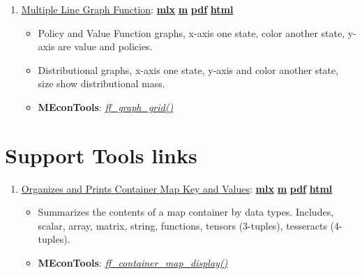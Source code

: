 \documentclass[
]{book}
\providecommand{\tightlist}{%
  \setlength{\itemsep}{0pt}\setlength{\parskip}{0pt}}
\begin{document}
\begin{enumerate}
\def\labelenumi{\arabic{enumi}.}
\tightlist
\item
  \href{https://fanwangecon.github.io/MEconTools/MEconTools/doc/graph/htmlpdfm/fx_graph_grid.html}{Multiple Line Graph Function}: \href{https://github.com/FanWangEcon/MEconTools/blob/master/MEconTools/doc/graph/fx_graph_grid.mlx}{\textbf{mlx}} \textbar{} \href{https://github.com/FanWangEcon/MEconTools/blob/master/MEconTools/doc/graph/htmlpdfm/fx_graph_grid.m}{\textbf{m}} \textbar{} \href{https://github.com/FanWangEcon/MEconTools/blob/master/MEconTools/doc/graph/htmlpdfm/fx_graph_grid.pdf}{\textbf{pdf}} \textbar{} \href{https://fanwangecon.github.io/MEconTools/MEconTools/doc/graph/htmlpdfm/fx_graph_grid.html}{\textbf{html}}

  \begin{itemize}
  \tightlist
  \item
    Policy and Value Function graphs, x-axis one state, color another state, y-axis are value and policies.
  \item
    Distributional graphs, x-axis one state, y-axis and color another state, size show distributional mass.
  \item
    \textbf{MEconTools}: \emph{\href{https://github.com/FanWangEcon/MEconTools/blob/master/MEconTools/graph/ff_graph_grid.m}{ff\_graph\_grid()}}
  \end{itemize}
\end{enumerate}

\hypertarget{support-tools-links}{%
\section{Support Tools links}\label{support-tools-links}}

\begin{enumerate}
\def\labelenumi{\arabic{enumi}.}
\tightlist
\item
  \href{https://fanwangecon.github.io/MEconTools/MEconTools/doc/tools/htmlpdfm/fx_container_map_display.html}{Organizes and Prints Container Map Key and Values}: \href{https://github.com/FanWangEcon/MEconTools/blob/master/MEconTools/doc/tools/fx_container_map_display.mlx}{\textbf{mlx}} \textbar{} \href{https://github.com/FanWangEcon/MEconTools/blob/master/MEconTools/doc/tools/htmlpdfm/fx_container_map_display.m}{\textbf{m}} \textbar{} \href{https://github.com/FanWangEcon/MEconTools/blob/master/MEconTools/doc/tools/htmlpdfm/fx_container_map_display.pdf}{\textbf{pdf}} \textbar{} \href{https://fanwangecon.github.io/MEconTools/MEconTools/doc/tools/htmlpdfm/fx_container_map_display.html}{\textbf{html}}

  \begin{itemize}
  \tightlist
  \item
    Summarizes the contents of a map container by data types. Includes, scalar, array, matrix, string, functions, tensors (3-tuples), tesseracts (4-tuples).
  \item
    \textbf{MEconTools}: \emph{\href{https://github.com/FanWangEcon/MEconTools/blob/master/MEconTools/tools/ff_container_map_display.m}{ff\_container\_map\_display()}}
  \end{itemize}
\end{enumerate}
\end{document}
